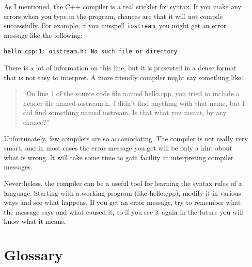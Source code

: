 As I mentioned, the C++ compiler is a real stickler for syntax.
If you make any errors when you type in the program, chances
are that it will not compile successfully.  For example, if
you misspell {\tt iostream}, you might get an error message like
the following:

\begin{verbatim}
hello.cpp:1: oistream.h: No such file or directory
\end{verbatim}
%
There is a lot of information on this line, but it is presented
in a dense format that is not easy to interpret.  A more friendly
compiler might say something like:

\begin{quote}
``On line 1 of the source code file named hello.cpp, you tried to
include a header file named oistream.h.  I didn't find anything
with that name, but I did find something named iostream.  Is
that what you meant, by any chance?''
\end{quote}

Unfortunately, few compilers are so accomodating.  The compiler
is not really very smart, and in most cases the error message
you get will be only a hint about what is wrong.  It will take
some time to gain facility at interpreting compiler messages.

Nevertheless, the compiler can be a useful tool for learning the
syntax rules of a language.  Starting with a working program
(like hello.cpp), modify it in various ways and see what happens.
If you get an error message, try to remember what the message says
and what caused it, so if you see it again in the future you
will know what it means.

\section{Glossary}

